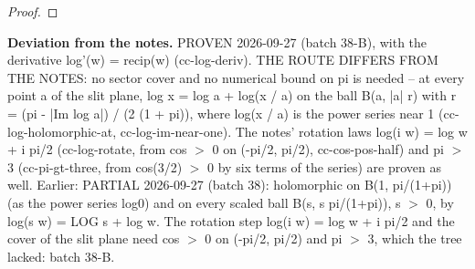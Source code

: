 \begin{proof}
%
%
%
%
%
%
\end{proof}
%
\noindent\textbf{Deviation from the notes.} PROVEN 2026-09-27 (batch 38-B), with the derivative log'(w) = recip(w) (cc-log-deriv). THE ROUTE DIFFERS FROM THE NOTES: no sector cover and no numerical bound on pi is needed -- at every point a of the slit plane, log x = log a + log(x / a) on the ball B(a, |a| r) with r = (pi - |Im log a|) / (2 (1 + pi)), where log(x / a) is the power series near 1 (cc-log-holomorphic-at, cc-log-im-near-one). The notes' rotation laws log(i w) = log w + i pi/2 (cc-log-rotate, from cos $>$ 0 on (-pi/2, pi/2), cc-cos-pos-half) and pi $>$ 3 (cc-pi-gt-three, from cos(3/2) $>$ 0 by six terms of the series) are proven as well. Earlier: PARTIAL 2026-09-27 (batch 38): holomorphic on B(1, pi/(1+pi)) (as the power series log0) and on every scaled ball B(s, s pi/(1+pi)), s $>$ 0, by log(s w) = LOG s + log w. The rotation step log(i w) = log w + i pi/2 and the cover of the slit plane need cos $>$ 0 on (-pi/2, pi/2) and pi $>$ 3, which the tree lacked: batch 38-B.
